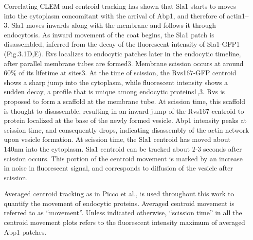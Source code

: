 \vspace{7mm}
Correlating CLEM and centroid tracking has shown that Sla1 starts to moves into the cytoplasm concomitant with the arrival of Abp1, and therefore of actin1–3. Sla1 moves inwards along with the membrane and follows it through endocytosis. As inward movement of the coat begins, the Sla1 patch is disassembled, inferred from the decay of the fluorescent intensity of Sla1-GFP1 (Fig.3.1D,E). Rvs localizes to endocytic patches later in the endocytic timeline, after parallel membrane tubes are formed3. Membrane scission occurs at around 60\% of its lifetime at sites3. At the time of scission, the Rvs167-GFP centroid shows a sharp jump into the cytoplasm, while fluorescent intensity shows a sudden decay, a profile that is unique among endocytic proteins1,3. Rvs is proposed to form a scaffold at the membrane tube. At scission time, this scaffold is thought to disassemble, resulting in an inward jump of the Rvs167 centroid to protein localized at the base of the newly formed vesicle. Abp1 intensity peaks at scission time, and consequently drops, indicating disassembly of the actin network upon vesicle formation. At scission time, the Sla1 centroid has moved about 140nm into the cytoplasm. Sla1 centroid can be tracked about 2-3 seconds after scission occurs. This portion of the centroid movement is marked by an increase in noise in fluorescent signal, and corresponds to diffusion of the vesicle after scission.


\vspace{7mm}
Averaged centroid tracking as in Picco et al., is used throughout this work to quantify the movement of endocytic proteins. Averaged centroid movement is referred to as “movement”. Unless indicated otherwise, “scission time” in all the centroid movement plots refers to the fluorescent intensity maximum of averaged Abp1 patches.

